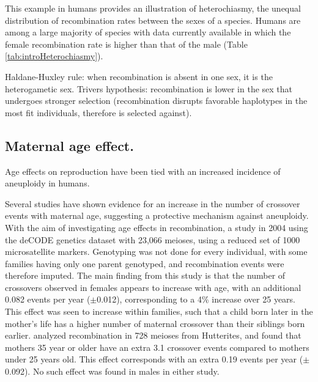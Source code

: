 This example in humans provides an illustration of heterochiasmy, the unequal distribution of recombination rates between the sexes of a species.
Humans are among a large majority of species with data currently available in which the female recombination rate is higher than that of the male (Table \ref{tab:introHeterochiasmy}).


Haldane-Huxley rule: when recombination is absent in one sex, it is the heterogametic sex.
%
Trivers hypothesis: recombination is lower in the sex that undergoes stronger selection (recombination disrupts favorable haplotypes in the most fit individuals, therefore is selected against).

\subsection{Maternal age effect.}

Age effects on reproduction have been tied with an increased incidence of aneuploidy in humans\cite{Hassold2001,Hassold2007}.

Several studies have shown evidence for an increase in the number of crossover events with maternal age, suggesting a protective mechanism against aneuploidy.
With the aim of investigating age effects in recombination, a study in 2004 using the deCODE genetics dataset with 23,066 meioses, using a reduced set of 1000 microsatellite markers\cite{Kong2004}.
Genotyping was not done for every individual, with some families having only one parent genotyped, and recombination events were therefore imputed.
The main finding from this study is that the number of crossovers observed in females appears to increase with age, with an additional 0.082 events per year ($\pm$0.012), corresponding to a 4\% increase over 25 years.
This effect was seen to increase within families, such that a child born later in the mother's life has a higher number of maternal crossover than their siblings born earlier.
\citet{Coop2008} analyzed recombination in 728 meioses from Hutterites, and found that mothers 35 year or older have an extra 3.1 crossover events compared to mothers under 25 years old.
This effect corresponds with an extra 0.19 events per year ($\pm$0.092).
No such effect was found in males in either study.

